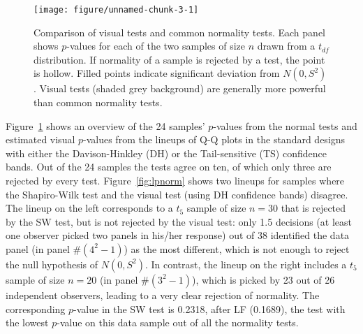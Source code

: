 \documentclass[12pt]{article}\usepackage[]{graphicx}\usepackage[]{color}
\newenvironment{knitrout}{}{} %
\begin{document}
\begin{figure}
\centering
\begin{knitrout}
\color{fgcolor}
\texttt{[image: figure/unnamed-chunk-3-1]} 

\end{knitrout}
\caption{\label{fig:pvals} Comparison of visual tests and common normality tests. Each panel shows $p$-values  for each of  the two samples of size $n$ drawn from a $t_{df}$ distribution. If normality of a sample is rejected by a test, the point is hollow. Filled points indicate significant deviation from $N(0, S^2)$. Visual tests (shaded grey background) are generally  more powerful than common normality tests.}
\end{figure}
\afterpage{\clearpage}
Figure~\ref{fig:pvals} shows an overview of the 24 samples' $p$-values  from the normal tests and estimated visual $p$-values from the lineups of Q-Q plots in the standard designs with either the Davison-Hinkley (DH) or the Tail-sensitive (TS) confidence bands. Out of the 24 samples the tests agree on ten, of which only three are rejected by every test.
Figure~\ref{fig:lpnorm} shows two lineups for samples where the Shapiro-Wilk test and the visual test (using DH confidence bands) disagree. 
The lineup on the left corresponds to a $t_5$ sample of size $n = 30$ that is rejected by the SW test, but is not rejected by the visual test: only 1.5 decisions (at least one observer picked two panels in his/her response) out of 38 identified the data panel (in panel \#$(4^2-1)$) as the most different, which is not enough to reject the null hypothesis of $N(0, S^2)$. 
In contrast, the  lineup  on the right includes a $t_5$ sample of size $n=20$ (in panel \#$(3^2-1)$), which is picked by 23 out of 26 independent observers, leading to a very clear rejection of normality. 
The corresponding $p$-value in the SW test is 0.2318, after LF (0.1689), the test with the lowest $p$-value on this data sample out of all the normality tests.
\end{document}
